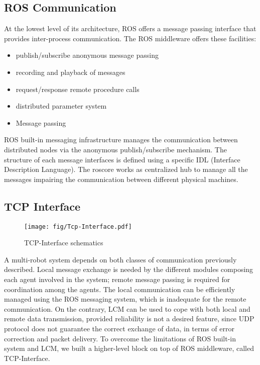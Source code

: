 \subsection{ROS Communication}

	At the lowest level of its architecture, ROS offers a message passing interface that provides inter-process communication.
	The ROS middleware offers these facilities:
	\begin{itemize}
		\item publish/subscribe anonymous message passing
		\item recording and playback of messages
		\item request/response remote procedure calls
		\item distributed parameter system
		\item Message passing
	\end{itemize}
	ROS built-in messaging infrastructure manages the communication between distributed nodes via the anonymous publish/subscribe mechanism. The structure of each message interfaces is defined using a specific IDL (Interface Description Language).
	The roscore works as centralized hub to manage all the messages impairing the communication between different physical machines. 

\subsection{TCP Interface}

\begin{figure}
\centering
\texttt{[image: fig/Tcp-Interface.pdf]}
\caption{TCP-Interface schematics}
\label{fig:Tcp-Interface}
\end{figure}

		
	A multi-robot system depends on both classes of communication previously described. Local message exchange is needed by the different modules composing each agent involved in
	the system; remote message passing is required for coordination among the agents. The local communication can be efficiently managed using the ROS messaging system, which is inadequate
	for the remote communication. On the contrary, LCM can be used to cope with both local and remote data transmission, provided reliability is not a desired feature, since UDP protocol does not guarantee the correct exchange of data, in terms of error correction and packet delivery.
	To overcome the limitations of ROS built-in system and LCM, we built a higher-level block on top of ROS middleware, called TCP-Interface.


